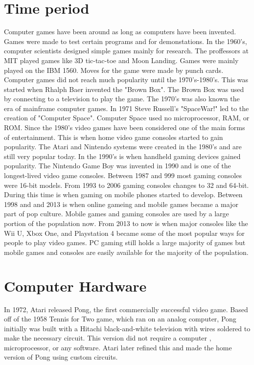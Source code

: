 \documentclass[letterpaper, 10 pt, conference]{IEEEconf}
\begin{document}
\section{Time period}
Computer games have been around as long as computers have been invented. Games were made to test certain programs and for demonstations. In the 1960's, computer scientists designed simple games mainly for research. The proffessors at MIT played games like 3D tic-tac-toe and Moon Landing. Games were mainly played on the IBM 1560. Moves for the game were made by punch cards. Computer games did not reach much popularity until the 1970's-1980's. This was started when Rhalph Baer invented the "Brown Box". The Brown Box was used by connecting to a television to play the game. The 1970's was also known the era of mainframe computer games. In 1971 Steve Russell's "SpaceWar!" led to the creation of "Computer Space". Computer Space used no microprocessor, RAM, or ROM. Since the 1980's video games have been considered one of the main forms of entertainment. This is when home video game consoles started to gain popularity. The Atari and Nintendo systems were created in the 1980's and are still very popular today. In the 1990's is when handheld gaming devices gained popularity. The Nintendo Game Boy was invented in 1990 and is one of the longest-lived video game consoles. Between 1987 and 999 most gaming consoles were 16-bit models. From 1993 to 2006 gaming consoles changes to 32 and 64-bit. During this time is when gaming on mobile phones started to develop. Between 1998 and and 2013 is when online gameing and mobile games became a major part of pop culture. Mobile games and gaming consoles are used by a large portion of the population now. From 2013 to now is when major consoles like the Wii U, Xbox One, and Playstation 4 became some of the most popular ways for people to play video games. PC gaming still holds a large majority of games but mobile games and consoles are easily available for the majority of the population.
\section{Computer Hardware}
In 1972, Atari released Pong,  the first commercially successful video game. 
Based off of the 1958 Tennis for Two game, which ran on an analog computer, 
Pong initially was built  with a Hitachi black-and-white television with wires
soldered to make the necessary circuit. This version did not require a computer
, microprocessor, or any software. Atari later refined this and made the home 
version of Pong using custom circuits.
\end{document}
